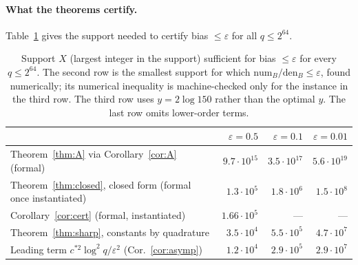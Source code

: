 \paragraph{What the theorems certify.}
Table~\ref{tab:params} gives the support needed to certify bias $\le\varepsilon$ for all $q\le2^{64}$.

\begin{table}[ht]
\centering
\begin{tabular}{lrrr}
\toprule
 & $\varepsilon=0.5$ & $\varepsilon=0.1$ & $\varepsilon=0.01$\\
\midrule
Theorem~\ref{thm:A} via Corollary~\ref{cor:A} (formal) & $9.7\cdot10^{15}$ & $3.5\cdot10^{17}$ & $5.6\cdot10^{19}$\\
Theorem~\ref{thm:closed}, closed form (formal once instantiated) & $1.3\cdot10^{5}$ & $1.8\cdot10^{6}$ & $1.5\cdot10^{8}$\\
Corollary~\ref{cor:cert} (formal, instantiated) & $1.66\cdot10^{5}$ & --- & ---\\
Theorem~\ref{thm:sharp}, constants by quadrature & $3.5\cdot10^{4}$ & $5.5\cdot10^{5}$ & $4.7\cdot10^{7}$\\
Leading term $c^{*2}\log^2q/\varepsilon^2$ (Cor.~\ref{cor:asymp}) & $1.2\cdot10^{4}$ & $2.9\cdot10^{5}$ & $2.9\cdot10^{7}$\\
\bottomrule
\end{tabular}
\caption{Support $X$ (largest integer in the support) sufficient for bias $\le\varepsilon$ for every $q\le2^{64}$.
The second row is the smallest support for which $\mathrm{num}_B/\mathrm{den}_B\le\varepsilon$, found numerically;
its numerical inequality is machine-checked only for the instance in the third row. The third row uses
$y=2\log150$ rather than the optimal $y$. The last row omits lower-order terms.}\label{tab:params}
\end{table}
